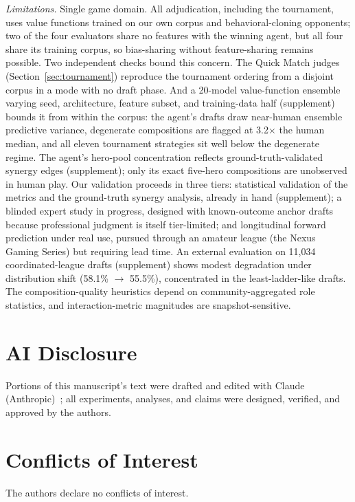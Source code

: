 \documentclass[journal]{IEEEtran}
\begin{document}
\textit{Limitations.} Single game domain. All adjudication, including the tournament, uses value functions trained on our own corpus and behavioral-cloning opponents; two of the four evaluators share no features with the winning agent, but all four share its training corpus, so bias-sharing without feature-sharing remains possible. Two independent checks bound this concern. The Quick Match judges (Section~\ref{sec:tournament}) reproduce the tournament ordering from a disjoint corpus in a mode with no draft phase. And a 20-model value-function ensemble varying seed, architecture, feature subset, and training-data half (supplement) bounds it from within the corpus: the agent's drafts draw near-human ensemble predictive variance, degenerate compositions are flagged at 3.2$\times$ the human median, and all eleven tournament strategies sit well below the degenerate regime. The agent's hero-pool concentration reflects ground-truth-validated synergy edges (supplement); only its exact five-hero compositions are unobserved in human play. Our validation proceeds in three tiers: statistical validation of the metrics and the ground-truth synergy analysis, already in hand (supplement); a blinded expert study in progress, designed with known-outcome anchor drafts because professional judgment is itself tier-limited; and longitudinal forward prediction under real use, pursued through an amateur league (the Nexus Gaming Series) but requiring lead time. An external evaluation on 11{,}034 coordinated-league drafts (supplement) shows modest degradation under distribution shift (58.1\% $\to$ 55.5\%), concentrated in the least-ladder-like drafts. The composition-quality heuristics depend on community-aggregated role statistics, and interaction-metric magnitudes are snapshot-sensitive.


\section*{AI Disclosure}

Portions of this manuscript's text were drafted and edited with Claude (Anthropic)~\cite{claude}; all experiments, analyses, and claims were designed, verified, and approved by the authors.

\section*{Conflicts of Interest}

The authors declare no conflicts of interest.
\end{document}

